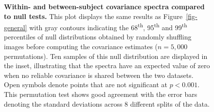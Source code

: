 \documentclass[10pt]{article}
\begin{document}
\begin{figure}[H]


\caption{\label{fig-significance-test}\textbf{Within- and
between-subject covariance spectra compared to null tests.} This plot
displays the same results as Figure~\ref{fig-general} with gray contours
indicating the 68\textsuperscript{th}, 95\textsuperscript{th} and
99\textsuperscript{th} percentiles of null distributions obtained by
randomly shuffling images before computing the covariance estimates
(\(n = 5,000\) permutations). Ten samples of this null distribution are
displayed in the inset, illustrating that the spectra have an expected
value of zero when no reliable covariance is shared between the two
datasets. Open symbols denote points that are not significant at
\(p < 0.001\). This permutation test shows good agreement with the error
bars denoting the standard deviations across 8 different splits of the
data.}

\end{figure}%
\end{document}
